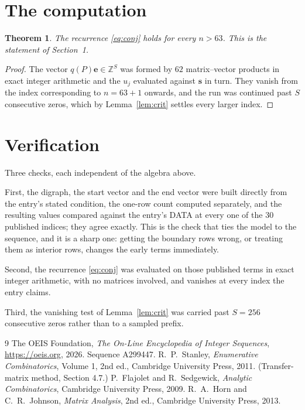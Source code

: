 \documentclass[11pt,a4paper]{article}
\theoremstyle{plain}
\newtheorem{theorem}{Theorem}
\theoremstyle{definition}
\begin{document}
\section{The computation}

\begin{theorem}
The recurrence \eqref{eq:conj} holds for every $n>63$. This is the statement of
Section~1.
\end{theorem}

\begin{proof}
The vector $q(P)\mathbf{e}\in\mathbb{Z}^{S}$ was formed by $62$ matrix--vector
products in exact integer arithmetic and the $u_j$ evaluated against $\mathbf{s}$ in turn.
They vanish from the index corresponding to $n=63+1$ onwards, and the run was continued
past $S$ consecutive zeros, which by Lemma~\ref{lem:crit} settles every larger index.
\end{proof}

\section{Verification}

Three checks, each independent of the algebra above.

First, the digraph, the start vector and the end vector were built directly from the
entry's stated condition, the one-row count computed separately, and the resulting values
compared against the entry's DATA at every one of the $30$ published indices; they
agree exactly. This is the check that ties the model to the sequence, and it is a sharp one:
getting the boundary rows wrong, or treating them as interior rows, changes the early terms
immediately.

Second, the recurrence \eqref{eq:conj} was evaluated on those published terms in exact
integer arithmetic, with no matrices involved, and vanishes at every index the entry claims.

Third, the vanishing test of Lemma~\ref{lem:crit} was carried past $S=256$ consecutive
zeros rather than to a sampled prefix.

\begin{thebibliography}{9}
 The OEIS Foundation, \emph{The On-Line Encyclopedia of Integer
Sequences}, \url{https://oeis.org}, 2026. Sequence A299447.
 R.~P.~Stanley, \emph{Enumerative Combinatorics}, Volume 1, 2nd ed.,
Cambridge University Press, 2011. (Transfer-matrix method, Section 4.7.)
 P.~Flajolet and R.~Sedgewick, \emph{Analytic Combinatorics}, Cambridge
University Press, 2009.
 R.~A.~Horn and C.~R.~Johnson, \emph{Matrix Analysis}, 2nd ed., Cambridge
University Press, 2013.
\end{thebibliography}
\end{document}
